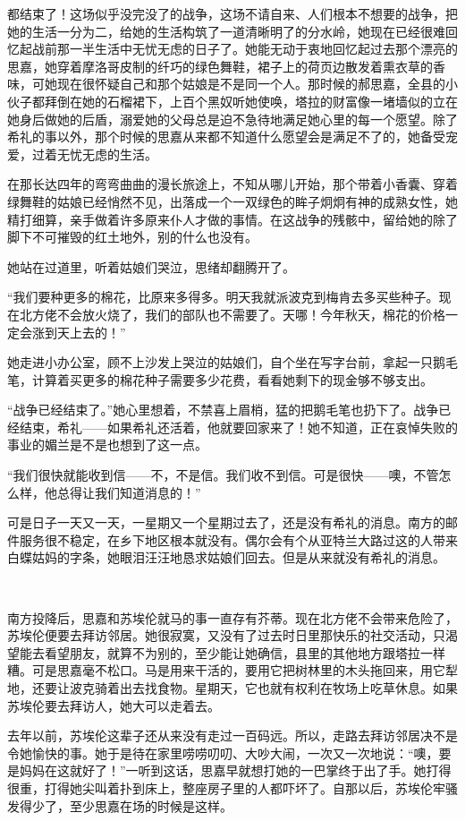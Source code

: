 \par 都结束了！这场似乎没完没了的战争，这场不请自来、人们根本不想要的战争，把她的生活一分为二，给她的生活构筑了一道清晰明了的分水岭，她现在已经很难回忆起战前那一半生活中无忧无虑的日子了。她能无动于衷地回忆起过去那个漂亮的思嘉，她穿着摩洛哥皮制的纤巧的绿色舞鞋，裙子上的荷页边散发着熏衣草的香味，可她现在很怀疑自己和那个姑娘是不是同一个人。那时候的郝思嘉，全县的小伙子都拜倒在她的石榴裙下，上百个黑奴听她使唤，塔拉的财富像一堵墙似的立在她身后做她的后盾，溺爱她的父母总是迫不急待地满足她心里的每一个愿望。除了希礼的事以外，那个时候的思嘉从来都不知道什么愿望会是满足不了的，她备受宠爱，过着无忧无虑的生活。
\par 在那长达四年的弯弯曲曲的漫长旅途上，不知从哪儿开始，那个带着小香囊、穿着绿舞鞋的姑娘已经悄然不见，出落成一个一双绿色的眸子炯炯有神的成熟女性，她精打细算，亲手做着许多原来仆人才做的事情。在这战争的残骸中，留给她的除了脚下不可摧毁的红土地外，别的什么也没有。
\par 她站在过道里，听着姑娘们哭泣，思绪却翻腾开了。
\par “我们要种更多的棉花，比原来多得多。明天我就派波克到梅肯去多买些种子。现在北方佬不会放火烧了，我们的部队也不需要了。天哪！今年秋天，棉花的价格一定会涨到天上去的！”
\par 她走进小办公室，顾不上沙发上哭泣的姑娘们，自个坐在写字台前，拿起一只鹅毛笔，计算着买更多的棉花种子需要多少花费，看看她剩下的现金够不够支出。
\par “战争已经结束了。”她心里想着，不禁喜上眉梢，猛的把鹅毛笔也扔下了。战争已经结束，希礼——如果希礼还活着，他就要回家来了！她不知道，正在哀悼失败的事业的媚兰是不是也想到了这一点。
\par “我们很快就能收到信——不，不是信。我们收不到信。可是很快——噢，不管怎么样，他总得让我们知道消息的！”
\par 可是日子一天又一天，一星期又一个星期过去了，还是没有希礼的消息。南方的邮件服务很不稳定，在乡下地区根本就没有。偶尔会有个从亚特兰大路过这的人带来白蝶姑妈的字条，她眼泪汪汪地恳求姑娘们回去。但是从来就没有希礼的消息。
\par  
\par 南方投降后，思嘉和苏埃伦就马的事一直存有芥蒂。现在北方佬不会带来危险了，苏埃伦便要去拜访邻居。她很寂寞，又没有了过去时日里那快乐的社交活动，只渴望能去看望朋友，就算不为别的，至少能让她确信，县里的其他地方跟塔拉一样糟。可是思嘉毫不松口。马是用来干活的，要用它把树林里的木头拖回来，用它犁地，还要让波克骑着出去找食物。星期天，它也就有权利在牧场上吃草休息。如果苏埃伦要去拜访人，她大可以走着去。
\par 去年以前，苏埃伦这辈子还从来没有走过一百码远。所以，走路去拜访邻居决不是令她愉快的事。她于是待在家里唠唠叨叨、大吵大闹，一次又一次地说：“噢，要是妈妈在这就好了！”一听到这话，思嘉早就想打她的一巴掌终于出了手。她打得很重，打得她尖叫着扑到床上，整座房子里的人都吓坏了。自那以后，苏埃伦牢骚发得少了，至少思嘉在场的时候是这样。
